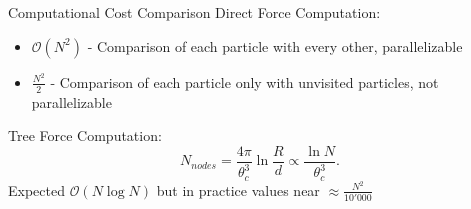 \begin{frame}{Computational Cost Comparison}
	Direct Force Computation:
	\begin{itemize}
		\item $\mathcal{O}(N^2)$ - Comparison of each particle with every other, parallelizable
		\item $\frac{N^2}{2}$ - Comparison of each particle only with unvisited particles, not parallelizable
	\end{itemize} \bigskip


	Tree Force Computation:
	\begin{equation}
		N_{nodes}=\frac{4 \pi}{\theta_c^3} \ln \frac{R}{d} \propto \frac{\ln N}{\theta_c^3} .
	\end{equation}
	Expected $\mathcal{O}(N\log{N})$ but in practice values near $\approx\frac{N^2}{10'000}$
\end{frame}
